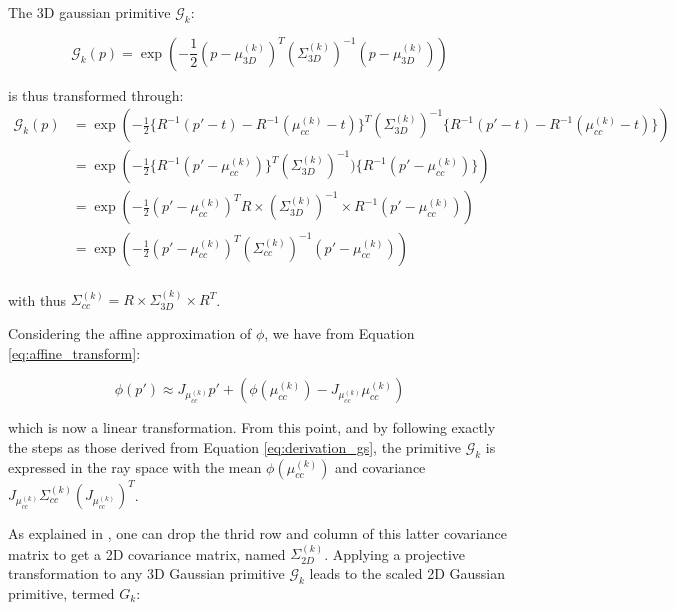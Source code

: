The 3D gaussian primitive $\mathcal{G}_{k}$: 

\begin{equation}
    \mathcal{G}_{k}(p) = \exp \left(-\frac{1}{2}(p-\mu^{(k)}_{3D})^{T}(\Sigma^{(k)}_{3D})^{-1}(p-\mu^{(k)}_{3D})\right)
  \end{equation}
  
is thus transformed through: 
\begin{equation}
    \label{eq:derivation_gs}
    \begin{aligned}
    \mathcal{G}_{k}(p) &= \exp \left( -\frac{1}{2} \{R^{-1}(p'-t) - R^{-1}(\mu^{(k)}_{cc} -t)\}^{T} (\Sigma^{(k)}_{3D})^{-1}\{R^{-1}(p'-t) - R^{-1}(\mu^{(k)}_{cc} -t)\}  \right) \\
    &= \exp \left( -\frac{1}{2}\{ R^{-1}(p'-\mu^{(k)}_{cc})\}^{T}(\Sigma^{(k)}_{3D})^{-1})\{ R^{-1}(p'-\mu^{(k)}_{cc})\} \right) \\
    &= \exp \left( -\frac{1}{2}(p'-\mu^{(k)}_{cc})^{T}R\times(\Sigma^{(k)}_{3D})^{-1}\times R^{-1}(p'-\mu^{(k)}_{cc})\right) \\
    &= \exp \left( -\frac{1}{2}(p'-\mu^{(k)}_{cc})^{T}(\Sigma^{(k)}_{cc})^{-1}(p'-\mu^{(k)}_{cc})\right) \\
    \end{aligned}
\end{equation}

with thus $\Sigma^{(k)}_{cc} = R\times \Sigma^{(k)}_{3D}\times R^{T}$. \newline


Considering the affine approximation of $\phi$, we have from Equation \eqref{eq:affine_transform}: 

\begin{equation}
  \phi(p')  \approx J_{\mu_{cc}^{(k)}}p' + (\phi(\mu_{cc}^{(k)}) -  J_{\mu_{cc}^{(k)}}\mu_{cc}^{(k)})
\end{equation}

which is now a linear transformation. From this point, and by following exactly the steps as those derived from Equation \eqref{eq:derivation_gs}, the primitive $\mathcal{G}_{k}$ is expressed in the ray space with the mean $\phi(\mu_{cc}^{(k)})$ and covariance $J_{\mu_{cc}^{(k)}}\Sigma^{(k)}_{cc}(J_{\mu_{cc}^{(k)}})^{T}$. 

As explained in \citep{zwicker2001ewa}, one can drop the thrid row and column of this latter covariance matrix to get a 2D covariance matrix, named $\Sigma^{(k)}_{2D}$. Applying a projective transformation to any 3D Gaussian primitive $\mathcal{G}_{k}$ leads to the scaled 2D Gaussian primitive, termed $G_{k}$: 

